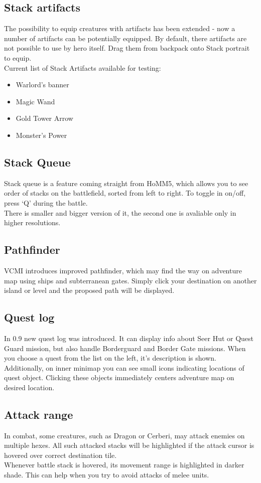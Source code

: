 \documentclass[a4size,final]{article}
\begin{document}
\subsection{Stack artifacts}
The possibility to equip creatures with artifacts has been extended - now a number of artifacts can be potentially equipped. By default, there artifacts are not possible to use by hero itself. Drag them from backpack onto Stack portrait to equip.\\
Current list of Stack Artifacts available for testing:
\begin{itemize}
\item Warlord's banner
\item Magic Wand
\item Gold Tower Arrow
\item Monster's Power
\end{itemize}
\label{Stack_Queue}
\subsection{Stack Queue}
Stack queue is a feature coming straight from HoMM5, which allows you to see order of stacks on the battlefield, sorted from left to right. To toggle in on/off, press `Q' during the battle.\\
There is smaller and bigger version of it, the second one is avaliable only in higher resolutions.
\subsection{Pathfinder}
VCMI introduces improved pathfinder, which may find the way on adventure map using ships and subterranean gates. Simply click your destination on another island or level and the proposed path will be displayed.
\label{Quest_Log}
\subsection{Quest log}
In 0.9 new quest log was introduced. It can display info about Seer Hut or Quest Guard mission, but also handle Borderguard and Border Gate missions. When you choose a quest from the list on the left, it's description is shown. Additionally, on inner minimap you can see small icons indicating locations of quest object. Clicking these objects immediately centers adventure map on desired location.
\subsection{Attack range}
In combat, some creatures, such as Dragon or Cerberi, may attack enemies on multiple hexes. All such attacked stacks will be highlighted if the attack cursor is hovered over correct destination tile.\\
Whenever battle stack is hovered, its movement range is highlighted in darker shade. This can help when you try to avoid attacks of melee units.
\end{document}
